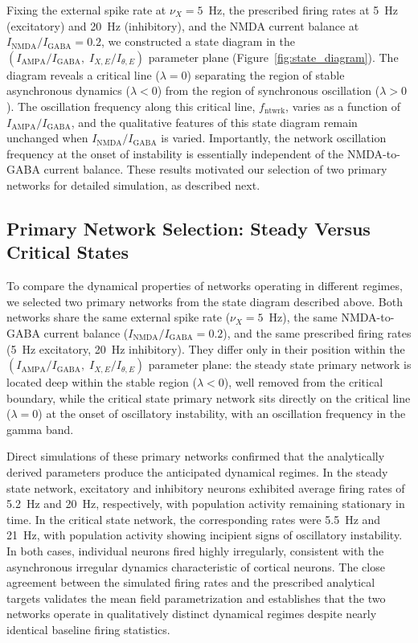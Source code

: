 \documentclass[10pt]{article}
\begin{document}
Fixing the external spike rate at $\nu_X = 5$~Hz, the prescribed firing rates at 5~Hz (excitatory) and 20~Hz (inhibitory), and the NMDA current balance at $I_{\mathrm{NMDA}}/I_{\mathrm{GABA}} = 0.2$, we constructed a state diagram in the $(I_{\mathrm{AMPA}}/I_{\mathrm{GABA}},\; I_{X,E}/I_{\theta,E})$ parameter plane (Figure~\ref{fig:state_diagram}). The diagram reveals a critical line ($\lambda = 0$) separating the region of stable asynchronous dynamics ($\lambda < 0$) from the region of synchronous oscillation ($\lambda > 0$). The oscillation frequency along this critical line, $f_{\mathrm{ntwrk}}$, varies as a function of $I_{\mathrm{AMPA}}/I_{\mathrm{GABA}}$, and the qualitative features of this state diagram remain unchanged when $I_{\mathrm{NMDA}}/I_{\mathrm{GABA}}$ is varied. Importantly, the network oscillation frequency at the onset of instability is essentially independent of the NMDA-to-GABA current balance. These results motivated our selection of two primary networks for detailed simulation, as described next.

\subsection{Primary Network Selection: Steady Versus Critical States}

To compare the dynamical properties of networks operating in different regimes, we selected two primary networks from the state diagram described above. Both networks share the same external spike rate ($\nu_X = 5$~Hz), the same NMDA-to-GABA current balance ($I_{\mathrm{NMDA}}/I_{\mathrm{GABA}} = 0.2$), and the same prescribed firing rates (5~Hz excitatory, 20~Hz inhibitory). They differ only in their position within the $(I_{\mathrm{AMPA}}/I_{\mathrm{GABA}},\; I_{X,E}/I_{\theta,E})$ parameter plane: the steady state primary network is located deep within the stable region ($\lambda < 0$), well removed from the critical boundary, while the critical state primary network sits directly on the critical line ($\lambda = 0$) at the onset of oscillatory instability, with an oscillation frequency in the gamma band.

Direct simulations of these primary networks confirmed that the analytically derived parameters produce the anticipated dynamical regimes. In the steady state network, excitatory and inhibitory neurons exhibited average firing rates of 5.2~Hz and 20~Hz, respectively, with population activity remaining stationary in time. In the critical state network, the corresponding rates were 5.5~Hz and 21~Hz, with population activity showing incipient signs of oscillatory instability. In both cases, individual neurons fired highly irregularly, consistent with the asynchronous irregular dynamics characteristic of cortical neurons. The close agreement between the simulated firing rates and the prescribed analytical targets validates the mean field parametrization and establishes that the two networks operate in qualitatively distinct dynamical regimes despite nearly identical baseline firing statistics.
\end{document}
